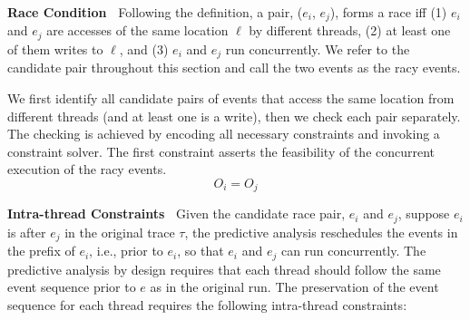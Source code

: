 
{\bf Race Condition\ } Following the definition, a pair, ($e_i$, $e_j$), forms a race iff (1) $e_i$ and $e_j$ are accesses of the same location $\ell$ by different threads, (2) at least one of them writes to $\ell$, and (3) $e_i$ and $e_j$ run concurrently. We refer to the candidate pair throughout this section and call the two events as the racy events.  

We first identify all candidate pairs of events that access the same location from different threads (and at least one is a write), then we check each pair  separately.   The checking is achieved by encoding all necessary constraints and invoking a constraint solver.  The first constraint asserts the feasibility of the concurrent execution of the racy events. 
$$
O_{i} = O_{j}
$$



{\bf Intra-thread Constraints\ } Given the candidate race pair, $e_i$ and $e_j$, suppose $e_i$ is after $e_j$ in the original trace $\tau$, the predictive analysis reschedules the events in the prefix of $e_i$, i.e., prior to $e_i$, so that $e_i$ and $e_j$ can run concurrently. The predictive analysis by design requires that each thread should follow the same event sequence prior to $e$ as in the original run.  The preservation of the event sequence for each thread requires the following intra-thread constraints:

